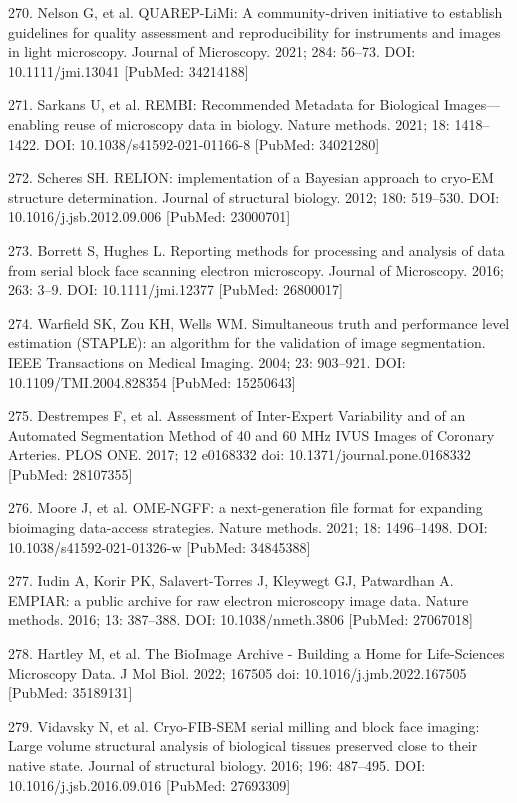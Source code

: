 \documentclass{article}
\begin{document}
\begin{hangpars}
270. Nelson G, et al. QUAREP-LiMi: A community-driven initiative to establish guidelines for quality assessment and reproducibility for instruments and images in light microscopy. Journal of Microscopy. 2021; 284: 56–73. DOI: 10.1111/jmi.13041 [PubMed: 34214188]

271. Sarkans U, et al. REMBI: Recommended Metadata for Biological Images—enabling reuse of microscopy data in biology. Nature methods. 2021; 18: 1418–1422. DOI: 10.1038/s41592-021-01166-8 [PubMed: 34021280]

272. Scheres SH. RELION: implementation of a Bayesian approach to cryo-EM structure determination. Journal of structural biology. 2012; 180: 519–530. DOI: 10.1016/j.jsb.2012.09.006 [PubMed: 23000701]

273. Borrett S, Hughes L. Reporting methods for processing and analysis of data from serial block face scanning electron microscopy. Journal of Microscopy. 2016; 263: 3–9. DOI: 10.1111/jmi.12377 [PubMed: 26800017]

274. Warfield SK, Zou KH, Wells WM. Simultaneous truth and performance level estimation (STAPLE): an algorithm for the validation of image segmentation. IEEE Transactions on Medical Imaging. 2004; 23: 903–921. DOI: 10.1109/TMI.2004.828354 [PubMed: 15250643]

275. Destrempes F, et al. Assessment of Inter-Expert Variability and of an Automated Segmentation Method of 40 and 60 MHz IVUS Images of Coronary Arteries. PLOS ONE. 2017; 12 e0168332 doi: 10.1371/journal.pone.0168332 [PubMed: 28107355]

276. Moore J, et al. OME-NGFF: a next-generation file format for expanding bioimaging data-access strategies. Nature methods. 2021; 18: 1496–1498. DOI: 10.1038/s41592-021-01326-w [PubMed: 34845388]

277. Iudin A, Korir PK, Salavert-Torres J, Kleywegt GJ, Patwardhan A. EMPIAR: a public archive for raw electron microscopy image data. Nature methods. 2016; 13: 387–388. DOI: 10.1038/nmeth.3806 [PubMed: 27067018]

278. Hartley M, et al. The BioImage Archive - Building a Home for Life-Sciences Microscopy Data. J Mol Biol. 2022; 167505 doi: 10.1016/j.jmb.2022.167505 [PubMed: 35189131]

279. Vidavsky N, et al. Cryo-FIB-SEM serial milling and block face imaging: Large volume structural analysis of biological tissues preserved close to their native state. Journal of structural biology. 2016; 196: 487–495. DOI: 10.1016/j.jsb.2016.09.016 [PubMed: 27693309]


\end{hangpars}
\end{document}
